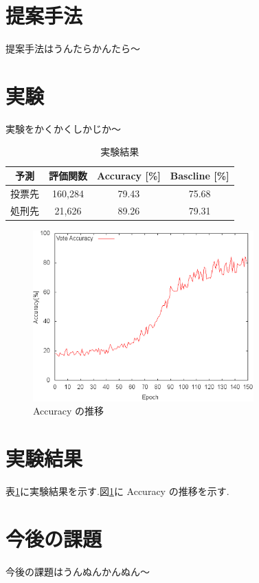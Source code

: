\documentclass[twocolumn]{jarticle}     %
\begin{document}
\section{提案手法}
提案手法はうんたらかんたら〜

\section{実験}
実験をかくかくしかじか〜

\begin{table}[hbtp]
  \caption{実験結果}
  \label{table:result}
  \centering
  \begin{tabular}{c|ccc}
    \hline
    予測 & 評価関数  & Accuracy [\%]  &  Bascline [\%]  \\
    \hline 
    投票先 & 160,284  & 79.43  & 75.68 \\
    処刑先 & 21,626  & 89.26  & 79.31 \\
    \hline
  \end{tabular}
\end{table}

\begin{figure}[htbp]
  \centering
  \includegraphics[width=85mm]{assets/accuracy.eps}
  \caption{Accuracy の推移}
  \label{fig:Accuracy}
\end{figure}

\section{実験結果}
表\ref{table:result}に実験結果を示す.図\ref{fig:Accuracy}に Accuracy の推移を示す.

\section{今後の課題}
今後の課題はうんぬんかんぬん〜


\end{document}

